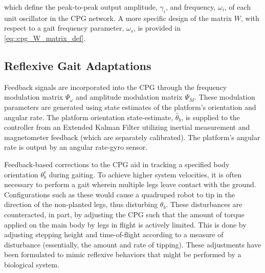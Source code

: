 which define the peak-to-peak output amplitude, $\gamma_{i}$, and frequency, $\omega_{i}$, of each \Ith unit oscillator in the CPG network. A more specific design of the matrix $W$, with respect to a gait frequency parameter, $\omega_{s}$, is provided in \ref{eq::cpg_W_matrix_def}.


		\subsection{Reflexive Gait Adaptations}

			Feedback signals are incorporated into the CPG through the frequency modulation matrix $\Psi_{\omega}$ and amplitude modulation matrix $\Psi_{M}$. These modulation parameters are generated using state estimates of the platform's orientation and angular rate. The platform orientation state-estimate, $\hat{\theta}_{b}$, is supplied to the controller from an Extended Kalman Filter utilizing inertial measurement and magnetometer feedback (which are separately calibrated). The platform's angular rate is output by an angular rate-gyro sensor.

			Feedback-based corrections to the CPG aid in tracking a specified body orientation $\theta_{b}^{r}$ during gaiting. To achieve higher system velocities, it is often necessary to perform a gait wherein multiple legs leave contact with the ground. Configurations such as these would cause a quadruped robot to tip in the direction of the non-planted legs, thus disturbing $\theta_{b}$. These disturbances are counteracted, in part, by adjusting the CPG such that the amount of torque applied on the main body by legs in flight is actively limited. This is done by adjusting stepping height and time-of-flight according to a measure of disturbance (essentially, the amount and rate of tipping). These adjustments have been formulated to mimic reflexive behaviors that might be performed by a biological system.

